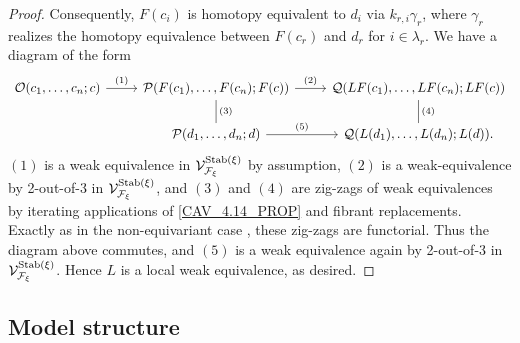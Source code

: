 \documentclass[psamsfonts,oneside,10pt,letterpaper
,draft
]{amsart}%
\renewcommand{\F}{\mathcal F}
\renewcommand{\1}{\ensuremath{\mathbb{id}}}
\renewcommand{\P}{\ensuremath{\mathcal{P}}}
\newcommand{\Q}{\ensuremath{\mathcal{Q}}}
\begin{document}
\begin{proof}
      Consequently, $F(c_i)$ is homotopy equivalent to $d_i$ via $k_{r,i}\gamma_r$,
      where $\gamma_r$ realizes the homotopy equivalence between $F(c_r)$ and $d_r$ for $i \in \lambda_r$.
      We have a diagram of the form
      \begin{equation}
            \label{TWOOFTHREE_EQ}
            \begin{tikzcd}
                  \O(c_1,\ldots, c_n;c) \arrow[r, "(1)"]
                  &
                  \P(F(c_1),\ldots, F(c_n); F(c)) \arrow[d,dash, "(3)"] \arrow[r, "(2)"]
                  &
                  \Q(LF(c_1),\ldots, LF(c_n);LF(c)) \arrow[d, dash, "(4)"]
                  \\
                  &
                  \P(d_1,\ldots, d_n;d) \arrow[r, "(5)"]
                  &
                  \Q(L(d_1),\ldots, L(d_n); L(d)).
            \end{tikzcd}
      \end{equation}
      $(1)$ is a weak equivalence in $\V^{\Stab(\ksi)}_{\F_\ksi}$ by assumption,
      $(2)$ is a weak-equivalence by 2-out-of-3 in $\V^{\Stab(\ksi)}_{\F_\ksi}$, and
      $(3)$ and $(4)$ are zig-zags of weak equivalences by iterating applications of \ref{CAV_4.14_PROP} and fibrant replacements.
      Exactly as in the non-equivariant case \cite[4.14]{Cav14},
      these zig-zags are functorial.
      Thus the diagram above commutes, and $(5)$ is a weak equivalence again by 2-out-of-3 in $\V^{\Stab(\ksi)}_{\F_\ksi}$.
      Hence $L$ is a local weak equivalence, as desired.
\end{proof}


\subsection{Model structure}
\end{document}
